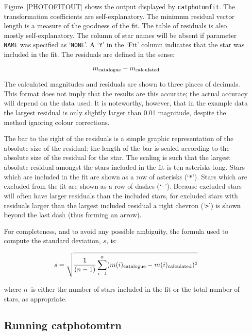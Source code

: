 \documentclass[twoside,11pt]{starlink}
\begin{document}
Figure~\ref{PHOTOFITOUT} shows the output displayed by \texttt{catphotomfit}.  The transformation coefficients are self-explanatory.
The minimum residual vector length is a measure of the goodness of the
fit.  The table of residuals is also mostly self-explanatory.  The column
of star names will be absent if parameter \texttt{NAME} was specified as
`\texttt{NONE}'.  A `\texttt{Y}' in the `Fit' column indicates that the star
was included in the fit.  The residuals are defined in the sense:

\begin{equation}
m_{\rm catalogue} - m_{\rm calculated}
\end{equation}

The calculated magnitudes and residuals are shown to three places of
decimals.  This format does not imply that the results are this
accurate; the actual accuracy will depend on the data used.  It is
noteworthy, however, that in the example data the largest residual is
only slightly larger than 0.01 magnitude, despite the method ignoring
colour corrections.

The bar to the right of the residuals is a simple graphic
representation of the absolute size of the residual; the length of the
bar is scaled according to the absolute size of the residual for the
star.  The scaling is such that the largest absolute residual amongst
the stars included in the fit is ten asterisks long.  Stars which are
included in the fit are shown as a row of asterisks (`\texttt{*}').  Stars
which are excluded from the fit are shown as a row of dashes (`\texttt{-}').  Because excluded stars will often have larger residuals than the
included stars, for excluded stars with residuals larger than the
largest included residual a right chevron (`\verb->-') is shown beyond
the last dash (thus forming an arrow).

For completeness, and to avoid any possible ambiguity, the formula used
to compute the standard deviation, $s$, is:

\begin{equation}
s = \sqrt{ \frac{1}{(n - 1)}
    \sum_{i=1}^{n} (m(i)_{\rm catalogue} - m(i)_{\rm calculated})^2 }
\end{equation}

where $n$\, is either the number of stars included in the fit or the
total number of stars, as appropriate.

\subsection{Running catphotomtrn}
\end{document}
